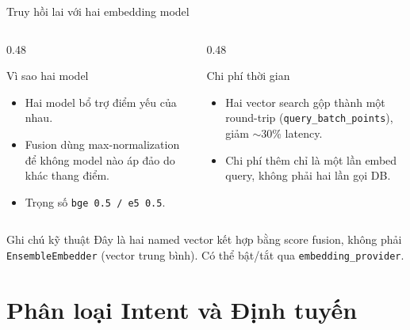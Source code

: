 \documentclass[t, aspectratio=169]{beamer}
\begin{document}
	\begin{frame}{Truy hồi lai với hai embedding model}
		\begin{columns}[T,onlytextwidth]
			\begin{column}{0.48\textwidth}
				\begin{block}{Vì sao hai model}
					\begin{itemize}
						\item Hai model bổ trợ điểm yếu của nhau.
						\item Fusion dùng max-normalization để không model nào áp đảo do khác thang điểm.
						\item Trọng số \texttt{bge 0.5 / e5 0.5}.
					\end{itemize}
				\end{block}
			\end{column}
			\begin{column}{0.48\textwidth}
				\begin{block}{Chi phí thời gian}
					\begin{itemize}
						\item Hai vector search gộp thành một round-trip (\texttt{query\_batch\_points}), giảm $\sim$30\% latency.
						\item Chi phí thêm chỉ là một lần embed query, không phải hai lần gọi DB.
					\end{itemize}
				\end{block}
			\end{column}
		\end{columns}

		\vspace{0.35cm}
		\begin{alertblock}{Ghi chú kỹ thuật}
			\small Đây là hai named vector kết hợp bằng score fusion, không phải \texttt{EnsembleEmbedder} (vector trung bình). Có thể bật/tắt qua \texttt{embedding\_provider}.
		\end{alertblock}
	\end{frame}

	\section{Phân loại Intent và Định tuyến}
\end{document}
